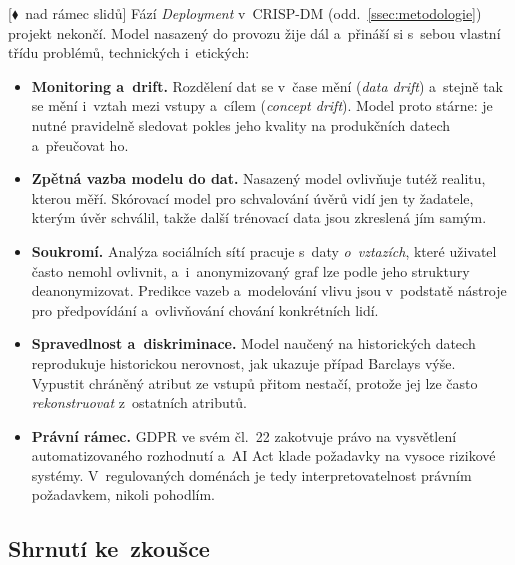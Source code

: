 \documentclass[11pt,a4paper]{article}
\theoremstyle{definition}
\newcommand{\mimo}{\textcolor{markcol}{\textsf{\footnotesize[$\blacklozenge$~nad rámec slidů]}}}
\begin{document}
\mimo{} Fází \emph{Deployment} v~CRISP-DM (odd.~\ref{ssec:metodologie}) projekt nekončí. Model
nasazený do provozu žije dál a~přináší si s~sebou vlastní třídu problémů, technických
i~etických:
\begin{itemize}
\item \textbf{Monitoring a~drift.} Rozdělení dat se v~čase mění (\emph{data drift}) a~stejně tak
      se mění i~vztah mezi vstupy a~cílem (\emph{concept drift}). Model proto stárne: je nutné
      pravidelně sledovat pokles jeho kvality na produkčních datech a~přeučovat ho.
\item \textbf{Zpětná vazba modelu do dat.} Nasazený model ovlivňuje tutéž realitu, kterou měří.
      Skórovací model pro schvalování úvěrů vidí jen ty žadatele, kterým úvěr schválil, takže
      další trénovací data jsou zkreslená jím samým.
\item \textbf{Soukromí.} Analýza sociálních sítí pracuje s~daty \emph{o~vztazích}, které
      uživatel často nemohl ovlivnit, a~i~anonymizovaný graf lze podle jeho struktury
      deanonymizovat. Predikce vazeb a~modelování vlivu jsou v~podstatě nástroje pro
      předpovídání a~ovlivňování chování konkrétních lidí.
\item \textbf{Spravedlnost a~diskriminace.} Model naučený na historických datech reprodukuje
      historickou nerovnost, jak ukazuje případ Barclays výše. Vypustit chráněný atribut ze
      vstupů přitom nestačí, protože jej lze často \emph{rekonstruovat} z~ostatních atributů.
\item \textbf{Právní rámec.} GDPR ve svém čl.~22 zakotvuje právo na vysvětlení automatizovaného
      rozhodnutí a~AI Act klade požadavky na vysoce rizikové systémy. V~regulovaných doménách je
      tedy interpretovatelnost právním požadavkem, nikoli pohodlím.
\end{itemize}

\subsection{Shrnutí ke~zkoušce}
\end{document}
